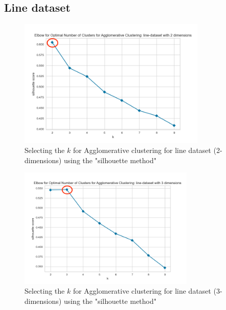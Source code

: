 \subsection{Line dataset}
\begin{figure}[H]
  \includegraphics[width=0.8\textwidth]{Method/images/k-values/line-dataset-2-agglomerative.png}
  \caption{Selecting the $k$ for Agglomerative clustering for line dataset (2-dimensions) using the "silhouette method"}
  \label{hyperparameters:agglomerative-line-dataset-2d}
\end{figure}
\begin{figure}[H]
  \includegraphics[width=0.75\textwidth]{Method/images/k-values/line-dataset-3-agglomerative.png}
  \caption{Selecting the $k$ for Agglomerative clustering for line dataset (3-dimensions) using the "silhouette method"}
  \label{hyperparameters:agglomerative-line-dataset-3d}
\end{figure}
\newpage
